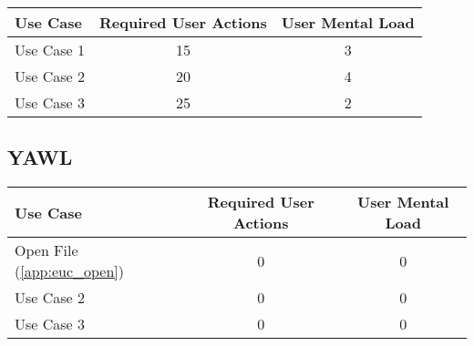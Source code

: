 \begin{tabularx}{\textwidth}{Xcc}
\textbf{Use Case} & \textbf{Required User Actions} & \textbf{User Mental Load}\\
\hline
Use Case 1                          & 15 & 3 \\
Use Case 2                          & 20 & 4 \\
Use Case 3                          & 25 & 2
\end{tabularx}

\subsection*{YAWL}

\begin{tabularx}{\textwidth}{Xcc}
\textbf{Use Case} & \textbf{Required User Actions} & \textbf{User Mental Load}\\
\hline
Open File (\ref{app:euc_open}) & 0 & 0 \\
Use Case 2                     & 0 & 0 \\
Use Case 3                     & 0 & 0
\end{tabularx}
